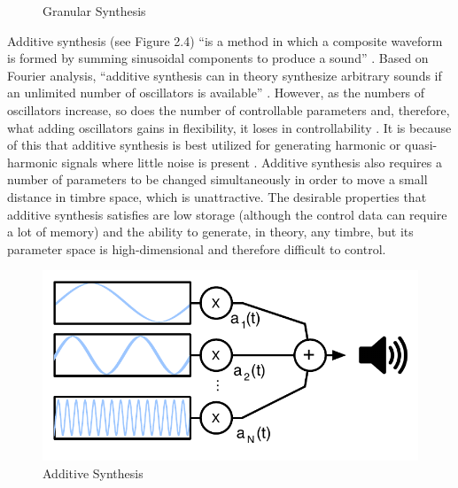 \documentclass[a4paper,12pt]{report} 	%
\numberwithin{figure}{chapter}
\numberwithin{table}{chapter}
\numberwithin{equation}{chapter}
\begin{document}
\begin{flushleft}
\begin{figure}[h!]
\begin{center}
\caption[Granular Synthesis]{Granular Synthesis}
\end{center}
\end{figure}
Additive synthesis (see Figure 2.4) ``is a method in which a composite waveform is formed by summing sinusoidal components to produce a sound'' \cite[p. 17]{Tolonen:1998bh}. Based on Fourier analysis, ``additive synthesis can in theory synthesize arbitrary sounds if an unlimited number of oscillators is available'' \cite[p. 94]{Tolonen:1998bh}. However, as the numbers of oscillators increase, so does the number of controllable parameters and, therefore, what adding oscillators gains in flexibility, it loses in controllability \cite[p. 7]{Klingbeil:2009lo}. It is because of this that additive synthesis is best utilized for generating harmonic or quasi-harmonic signals where little noise is present \cite[p. 5]{Vercoe:1998hh}. Additive synthesis also requires a number of parameters to be changed simultaneously in order to move a small distance in timbre space, which is unattractive. The desirable properties that additive synthesis satisfies are low storage (although the control data can require a lot of memory) and the ability to generate, in theory, any timbre, but its parameter space is high-dimensional and therefore difficult to control.
\\
\begin{figure}[h!]
\begin{center}
\includegraphics[scale=0.8]{AdditiveSynthesis}
\caption[Additive Synthesis]{Additive Synthesis}
\end{center}
\end{figure}

\end{flushleft}
\end{document}
